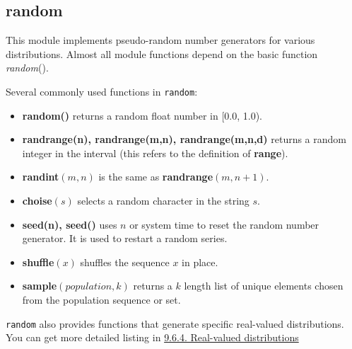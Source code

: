 \subsection{random}
This module implements pseudo-random number generators for various distributions. Almost all module functions depend on the basic function \textit{random}().

Several commonly used functions in \texttt{random}:
\begin{itemize}
\item \textbf{random()} returns a random float number in [0.0, 1.0).
\item \textbf{randrange(n), randrange(m,n), randrange(m,n,d)} returns a random integer in the interval (this refers to the definition of \textbf{range}).
\item \textbf{randint}$(m,n)$ is the same as \textbf{randrange}$(m,n+1)$.
\item \textbf{choise}$(s)$ selects a random character in the string $s$.
\item \textbf{seed(n), seed()} uses $n$ or system time to reset the random number generator. It is used to restart a random series.
\item \textbf{shuffle}$(x)$ shuffles the sequence $x$ in place.
\item \textbf{sample}$(population,k)$ returns a $k$ length list of unique elements chosen from the population sequence or set.
\end{itemize}
\texttt{random} also provides functions that generate specific real-valued distributions. You can get more detailed listing in \href{https://docs.python.org/3.6/library/random.html#real-valued-distributions}{9.6.4. Real-valued distributions}